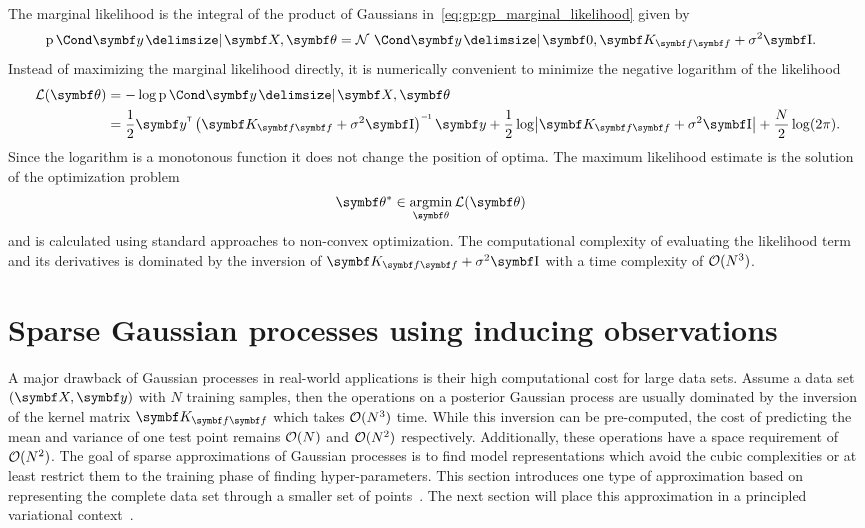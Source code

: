 The marginal likelihood is the integral of the product of Gaussians in~\cref{eq:gp:gp_marginal_likelihood} given by
\begin{align}
    \begin{split}
        \Prob{\mat{y} \given \mat{X}, \mat{\theta}}
        &= \Gaussian{\mat{y} \given \mat{0}, \mat{K}_{\mat{f}\mat{f}} + \sigma^2 \Eye}.
    \end{split}
\end{align}
Instead of maximizing the marginal likelihood directly, it is numerically convenient to minimize the negative logarithm of the likelihood
\begin{align}
    \begin{split}
        \Lc(\mat{\theta}) &= -\log\Prob{\mat{y} \given \mat{X}, \mat{\theta}} \\
        &=
        \frac{1}{2} \mat{y}\tran \left( \mat{K}_{\mat{f}\mat{f}} + \sigma^2 \Eye \right)\inv \mat{y} +
        \frac{1}{2} \log \abs*{\mat{K}_{\mat{f}\mat{f}} + \sigma^2 \Eye} +
        \frac{N}{2} \log(2\pi).
    \end{split}
\end{align}
Since the logarithm is a monotonous function it does not change the position of optima.
The maximum likelihood estimate is the solution of the optimization problem
\begin{align}
    \mat{\theta}^\ast & \in \argmin_{\mat{\theta}} \Lc(\mat{\theta})
\end{align}
and is calculated using standard approaches to non-convex optimization.
The computational complexity of evaluating the likelihood term and its derivatives is dominated by the inversion of $\mat{K}_{\mat{f}\mat{f}} + \sigma^2 \Eye$ with a time complexity of $\operatorname{\mathcal{O}}(N^3)$.

\section{Sparse Gaussian processes using inducing observations}
A major drawback of Gaussian processes in real-world applications is their high computational cost for large data sets.
Assume a data set $(\mat{X}, \mat{y})$ with $N$ training samples, then the operations on a posterior Gaussian process are usually dominated by the inversion of the kernel matrix $\mat{K}_{\mat{f}\mat{f}}$ which takes $\operatorname{\mathcal{O}}(N^3)$ time.
While this inversion can be pre-computed, the cost of predicting the mean and variance of one test point remains $\operatorname{\mathcal{O}}(N)$ and $\operatorname{\mathcal{O}}(N^2)$ respectively.
Additionally, these operations have a space requirement of $\operatorname{\mathcal{O}}(N^2)$.
The goal of sparse approximations of Gaussian processes is to find model representations which avoid the cubic complexities or at least restrict them to the training phase of finding hyper-parameters.
This section introduces one type of approximation based on representing the complete data set through a smaller set of points~\parencite{snelson_flexible_2007}.
The next section will place this approximation in a principled variational context~\parencite{titsias_variational_2009,hensman_gaussian_2013}.

